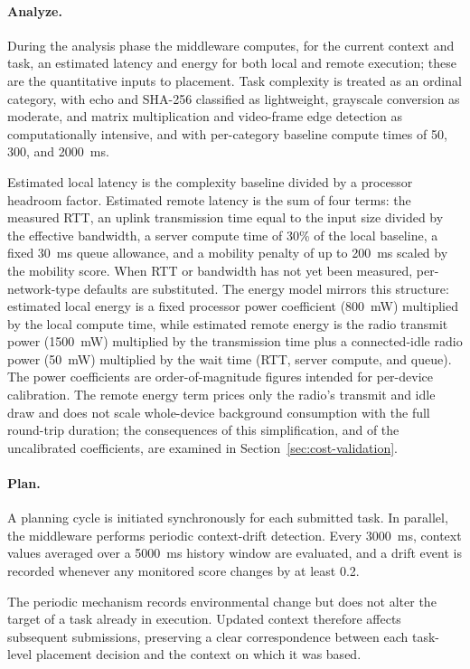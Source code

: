 \paragraph{Analyze.}
During the analysis phase the middleware computes, for the current context and
task, an estimated latency and energy for both local and remote execution;
these are the quantitative inputs to placement. Task complexity is treated as an
ordinal category, with echo and SHA-256 classified as lightweight, grayscale
conversion as moderate, and matrix multiplication and video-frame edge detection
as computationally intensive, and with per-category baseline compute times of
50, 300, and 2000~ms.

Estimated local latency is the complexity baseline divided by a processor
headroom factor. Estimated remote latency is the sum of four terms: the measured
RTT, an uplink transmission time equal to the input size divided by the
effective bandwidth, a server compute time of 30\% of the local baseline, a
fixed 30~ms queue allowance, and a mobility penalty of up to 200~ms scaled by
the mobility score. When RTT or bandwidth has not yet been measured,
per-network-type defaults are substituted. The energy model mirrors this
structure: estimated local energy is a fixed processor power coefficient
(800~mW) multiplied by the local compute time, while estimated remote energy is
the radio transmit power (1500~mW) multiplied by the transmission time plus a
connected-idle radio power (50~mW) multiplied by the wait time (RTT, server
compute, and queue). The power coefficients are order-of-magnitude figures
intended for per-device calibration. The remote energy term prices only the
radio's transmit and idle draw and does not scale whole-device background
consumption with the full round-trip duration; the consequences of this
simplification, and of the uncalibrated coefficients, are examined in
Section~\ref{sec:cost-validation}.

\paragraph{Plan.}
A planning cycle is initiated synchronously for each submitted task. In
parallel, the middleware performs periodic context-drift detection. Every
3000~ms, context values averaged over a 5000~ms history window are evaluated,
and a drift event is recorded whenever any monitored score changes by at
least 0.2.

The periodic mechanism records environmental change but does not alter the
target of a task already in execution. Updated context therefore affects
subsequent submissions, preserving a clear correspondence between each
task-level placement decision and the context on which it was based.

